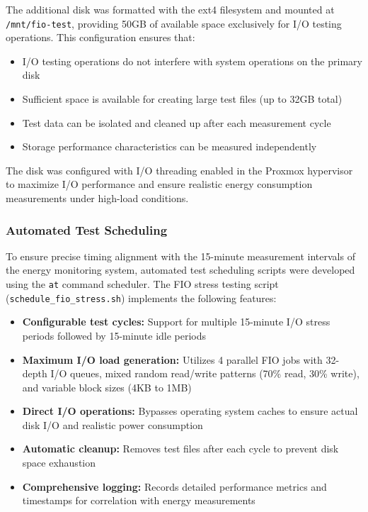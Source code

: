 The additional disk was formatted with the ext4 filesystem and mounted at \texttt{/mnt/fio-test},
providing 50GB of available space exclusively for I/O testing operations. This configuration
ensures that:

\begin{itemize}
    \item I/O testing operations do not interfere with system operations on the primary disk
    \item Sufficient space is available for creating large test files (up to 32GB total)
    \item Test data can be isolated and cleaned up after each measurement cycle
    \item Storage performance characteristics can be measured independently
\end{itemize}

The disk was configured with I/O threading enabled in the Proxmox hypervisor to maximize I/O
performance and ensure realistic energy consumption measurements under high-load conditions.

\subsubsection{Automated Test Scheduling}
To ensure precise timing alignment with the 15-minute measurement intervals of the energy
monitoring system, automated test scheduling scripts were developed using the \texttt{at}
command scheduler. The FIO stress testing script (\texttt{schedule\_fio\_stress.sh}) implements
the following features:

\begin{itemize}
    \item \textbf{Configurable test cycles:} Support for multiple 15-minute I/O stress periods
    followed by 15-minute idle periods
    \item \textbf{Maximum I/O load generation:} Utilizes 4 parallel FIO jobs with 32-depth I/O queues,
    mixed random read/write patterns (70\% read, 30\% write), and variable block sizes (4KB to 1MB)
    \item \textbf{Direct I/O operations:} Bypasses operating system caches to ensure actual disk I/O
    and realistic power consumption
    \item \textbf{Automatic cleanup:} Removes test files after each cycle to prevent disk space
    exhaustion
    \item \textbf{Comprehensive logging:} Records detailed performance metrics and timestamps
    for correlation with energy measurements
\end{itemize}

